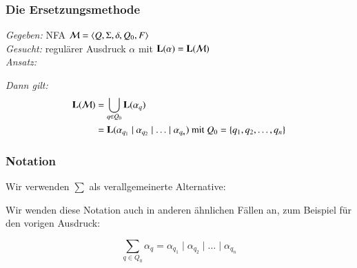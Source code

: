 \documentclass[onlymath]{beamer}
\begin{document}
\begin{frame}\frametitle{Die Ersetzungsmethode}

\emph{Gegeben:} NFA  $\mathcal{M}=\langle{Q,\Sigma,\delta,Q_0,F}\rangle$\\[1ex]
\emph{Gesucht:} regulärer Ausdruck $\alpha$ mit $\textbf{\textcolor{black}{L}}(\alpha)=\textbf{\textcolor{black}{L}}(\mathcal{M})$\\[1ex]

\emph{Ansatz:}


\emph{Dann gilt:}
\begin{align*}
\textbf{\textcolor{black}{L}}(\mathcal{M}) &=\bigcup_{q\in Q_0} \textbf{\textcolor{black}{L}}(\alpha_q) \\
	&=  \textbf{\textcolor{black}{L}}(\alpha_{q_1}\mid\alpha_{q_2}\mid\ldots\mid \alpha_{q_n})\text{ mit }Q_0=\{q_1,q_2,\ldots,q_n\}
\end{align*}

\end{frame}

\begin{frame}\frametitle{Notation}

Wir verwenden $\sum$ als verallgemeinerte Alternative:\medskip

\bigskip

Wir wenden diese Notation auch in anderen ähnlichen Fällen an, zum Beispiel für den vorigen Ausdruck:

\[\sum_{q\in Q_0} \alpha_q = \alpha_{q_1}\mid\alpha_{q_2}\mid\ldots\mid \alpha_{q_n}\]

\end{frame}
\end{document}
